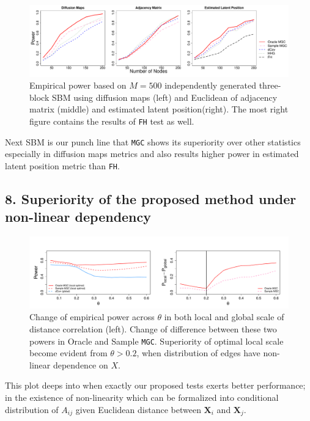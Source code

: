 \documentclass[12pt]{article}
\begin{document}
\begin{figure}[H]
	\centering
	\includegraphics[width=6in]{../Figure/ThreeSBM.pdf}
	\caption{Empirical power based on $M = 500$ independently generated three-block SBM using diffusion maps (left) and Euclidean of adjacency matrix (middle)  and estimated latent position(right). The most right figure contains the results of \texttt{FH} test as well.}
	\label{fig:Three}
\end{figure}	

Next SBM is our punch line that \texttt{MGC} shows its superiority over other statistics especially in diffusion maps metrics and also results higher power in estimated latent position metric than \texttt{FH}.

\subsection*{8. Superiority of the proposed method under non-linear dependency}

\begin{figure}[H]
	\centering
	\includegraphics[width=5in]{../Figure/powerplot.pdf}
	\caption{Change of empirical power across $\theta$ in both local and global scale of distance correlation (left). Change of difference between these two powers in Oracle and Sample \texttt{MGC}. Superiority of optimal local scale become evident from $\theta > 0.2$, when distribution of edges have non-linear dependence on $X$.}
	\label{fig:powerplot}
\end{figure}

This plot deeps into when exactly our proposed tests exerts better performance; in the existence of non-linearity which can be formalized into conditional distribution of $A_{ij}$ given Euclidean distance between $\mathbf{X}_{i}$ and $\mathbf{X}_{j}$.
\end{document}
